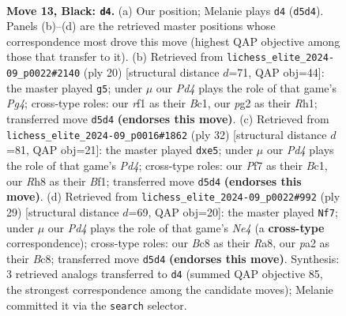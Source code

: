 \documentclass[11pt]{article}
\begin{document}
\clearpage

\begin{figure}[p]\centering
\begin{subfigure}{0.46\textwidth}\centering
\resizebox{\linewidth}{!}{%
\newchessgame
\chessboard[
  setfen={r1bqkb1r/p4ppp/1pn5/3pP3/7P/1Q3N2/PP3PPK/RNB2R2 b q - 1 13},
  showmover=false,
  pgfstyle=straightmove, color=movearrow, markmove={d5-d4}
]}
\caption{}
\end{subfigure}\hfill
\begin{subfigure}{0.46\textwidth}\centering
\resizebox{\linewidth}{!}{%
\newchessgame
\chessboard[
  setfen={rn2k2r/1pq1b1pp/p2ppn2/4p3/4P1P1/2N4P/PPP2P2/R1BQKB1R w KQkq - 0 11},
  showmover=false,
  pgfstyle=straightmove, color=movearrow, markmove={g4-g5}
]}
\caption{}
\end{subfigure}
\\[4pt]
\begin{subfigure}{0.46\textwidth}\centering
\resizebox{\linewidth}{!}{%
\newchessgame
\chessboard[
  setfen={r1b1k2r/pp2qppp/2n5/3pp2P/3P4/2P5/PP3PP1/R1BQKB1R w KQkq - 1 17},
  showmover=false,
  pgfstyle=straightmove, color=movearrow, markmove={d4-e5}
]}
\caption{}
\end{subfigure}\hfill
\begin{subfigure}{0.46\textwidth}\centering
\resizebox{\linewidth}{!}{%
\newchessgame
\chessboard[
  setfen={r1bqk1nr/pp2b2p/6p1/3Pnp2/8/2N5/PP2QPPP/R1B1K1NR b KQkq - 3 15},
  showmover=false,
  pgfstyle=straightmove, color=movearrow, markmove={e5-f7}
]}
\caption{}
\end{subfigure}
\caption{\textbf{Move 13, Black: \texttt{d4}.} (a) Our position; Melanie plays \texttt{d4} (\texttt{d5d4}). Panels (b)--(d) are the retrieved master positions whose correspondence most drove this move (highest QAP objective among those that transfer to it). (b) Retrieved from \texttt{lichess\_elite\_2024-09\_p0022\#2140} (ply 20) [structural distance $d$=71, QAP obj=44]: the master played \texttt{g5}; under $\mu$ our \emph{Pd4} plays the role of that game's \emph{Pg4}; cross-type roles: our \emph{r}f1 as their \emph{B}c1, our \emph{p}g2 as their \emph{R}h1; transferred move \texttt{d5d4} \textbf{(endorses this move)}. (c) Retrieved from \texttt{lichess\_elite\_2024-09\_p0016\#1862} (ply 32) [structural distance $d$=81, QAP obj=21]: the master played \texttt{dxe5}; under $\mu$ our \emph{Pd4} plays the role of that game's \emph{Pd4}; cross-type roles: our \emph{P}f7 as their \emph{B}c1, our \emph{R}h8 as their \emph{B}f1; transferred move \texttt{d5d4} \textbf{(endorses this move)}. (d) Retrieved from \texttt{lichess\_elite\_2024-09\_p0022\#992} (ply 29) [structural distance $d$=69, QAP obj=20]: the master played \texttt{Nf7}; under $\mu$ our \emph{Pd4} plays the role of that game's \emph{Ne4} (a \textbf{cross-type} correspondence); cross-type roles: our \emph{B}c8 as their \emph{R}a8, our \emph{p}a2 as their \emph{B}c8; transferred move \texttt{d5d4} \textbf{(endorses this move)}. Synthesis: 3 retrieved analogs transferred to \texttt{d4} (summed QAP objective 85, the strongest correspondence among the candidate moves); Melanie committed it via the \texttt{search} selector.}
\label{fig:thought-m25}
\end{figure}
\end{document}
